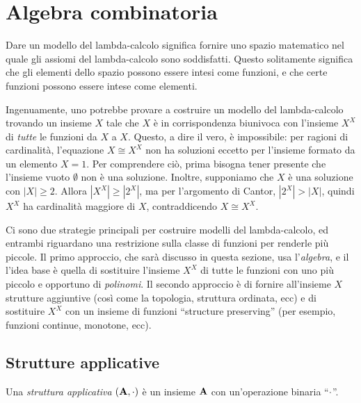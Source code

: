 \documentclass{article}
\begin{document}
\section{Algebra combinatoria}

Dare un modello del lambda-calcolo significa fornire uno spazio
matematico nel quale gli assiomi del lambda-calcolo sono soddisfatti.
Questo solitamente significa che gli elementi dello spazio possono essere
intesi come funzioni, e che certe funzioni possono essere intese come elementi.

Ingenuamente, uno potrebbe provare a costruire un modello del lambda-calcolo
trovando un insieme $X$ tale che $X$ \`e in corrispondenza biunivoca con
l'insieme $X^X$ di {\em tutte} le funzioni da $X$ a $X$. Questo, a dire
il vero, \`e impossibile: per ragioni di cardinalit\`a, l'equazione $X\cong X^X$
non ha soluzioni eccetto per l'insieme formato da un elemento $X=1$. Per
comprendere ci\`o, prima bisogna tener presente che l'insieme vuoto $\emptyset$ non
\`e una soluzione. Inoltre, supponiamo che $X$ \`e una soluzione con $|X|\geq 2$. 
Allora $|X^X|\geq |2^X|$, ma per l'argomento di Cantor, $|2^X|>|X|$, 
quindi $X^X$ ha cardinalit\`a maggiore di $X$, contraddicendo $X\cong X^X$.

Ci sono due strategie principali per costruire modelli del lambda-calcolo,
ed entrambi riguardano una restrizione sulla classe di funzioni per
renderle pi\`u piccole. Il primo approccio, che sar\`a discusso in questa sezione,
usa l'{\em algebra}, e il l'idea base \`e quella di sostituire
l'insieme $X^X$ di tutte le funzioni con uno pi\`u piccolo e opportuno di
{\em polinomi}. Il secondo approccio \`e di fornire all'insieme $X$ strutture
aggiuntive (cos\`i come la topologia, struttura ordinata, ecc) e di
sostituire $X^X$ con un insieme di funzioni ``structure preserving'' (per
esempio, funzioni continue, monotone, ecc).

\subsection{Strutture applicative}

\begin{definition}
  Una {\em struttura applicativa} $({\bf A},\cdot)$ \`e un insieme ${\bf A}$
  con un'operazione binaria ``$\cdot$''.
\end{definition}
\end{document}
